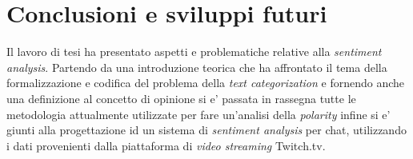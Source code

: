 \documentclass[a4paper,12pt,openright,twoside]{report}
\theoremstyle{definition}
\begin{document}


\chapter{Conclusioni e sviluppi futuri}
\label{ch:sviluppi}
Il lavoro di tesi ha presentato aspetti e problematiche relative alla \emph{sentiment analysis}.
Partendo da una introduzione teorica che ha affrontato il tema della formalizzazione e codifica
del problema della \emph{text categorization} e fornendo anche una definizione al concetto di 
opinione si e' passata in rassegna tutte le metodologia attualmente utilizzate per fare un'analisi
della \emph{polarity} infine
si e' giunti alla progettazione id un sistema di \emph{sentiment analysis} per chat, utilizzando
i dati provenienti dalla piattaforma di \emph{video streaming} Twitch.tv.
\end{document}

